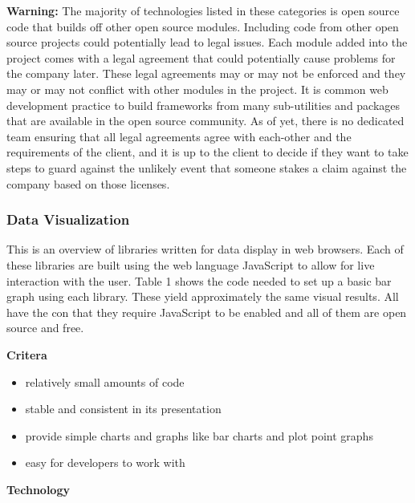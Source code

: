 \documentclass[draftclsnofoot,onecolumn,letterpaper,10pt]{IEEEtran}
\begin{document}
\textbf{Warning:}
The majority of technologies listed in these categories is open source code that builds off other open source modules.
Including code from other open source projects could potentially lead to legal issues.
Each module added into the project comes with a legal agreement that could potentially cause problems for the company later.
These legal agreements may or may not be enforced and they may or may not conflict with other modules in the project.
It is common web development practice to build frameworks from many sub-utilities and packages that are available in the open source community.
As of yet, there is no dedicated team ensuring that all legal agreements agree with each-other and the requirements of the client, and it is up to the client to decide if they want to take steps to guard against the unlikely event that someone stakes a claim against the company based on those licenses.\\






\subsubsection{Data Visualization}

This is an overview of libraries written for data display in web browsers.
Each of these libraries are built using the web language JavaScript to allow for live interaction with the user.
Table 1 shows the code needed to set up a basic bar graph using each library.
These yield approximately the same visual results.
All have the con that they require JavaScript to be enabled and all of them are open source and free.


\textbf{Critera}


	\begin{itemize}
		\item relatively small amounts of code
		\item stable and consistent in its presentation
		\item provide simple charts and graphs like bar charts and plot point graphs
		\item easy for developers to work with
	\end{itemize}


\textbf{Technology}
\end{document}
